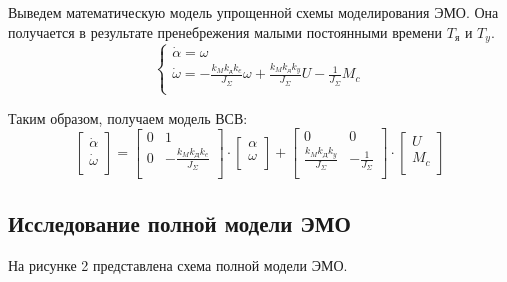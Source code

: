 \documentclass[a4paper, 11pt]{article}
\begin{document}
\par 
Выведем математическую модель упрощенной схемы моделирования ЭМО. Она получается в результате пренебрежения малыми постоянными времени $T_\text{я}$ и $T_y$.
\begin{equation}
	\begin{cases}
		\dot{\alpha} = \omega\\
		\displaystyle \dot{\omega} = -\frac{k_Mk_\text{д}k_e}{J_\Sigma} \omega+\frac{k_Mk_\text{д}k_y}{J_\Sigma} U-\frac{1}{J_\Sigma}M_c\\
	\end{cases}
\end{equation}
\par
Таким образом, получаем модель ВСВ:
\begin{equation}
	\begin{bmatrix}
		\dot{\alpha}\\
		\dot{\omega}\\
	\end{bmatrix}
	=
	\begin{bmatrix}
		0 & 1\\
		\displaystyle 0 & -\frac{k_Mk_\text{Д}k_e}{J_\Sigma}\\
	\end{bmatrix}
	\cdot
	\begin{bmatrix}
		\alpha\\
		\omega\\
	\end{bmatrix}
	+
	\begin{bmatrix}
		0 & 0\\
		\displaystyle \frac{k_Mk_\text{Д}k_y}{J_\Sigma} & -\frac{1}{J_\Sigma}\\
	\end{bmatrix}
	\cdot
	\begin{bmatrix}
		U\\
		M_c\\
	\end{bmatrix}
\end{equation}

\newpage
\begin{center}
	\section{Исследование полной модели ЭМО}
\end{center}
\par 
На рисунке 2 представлена схема полной модели ЭМО.
\end{document}
